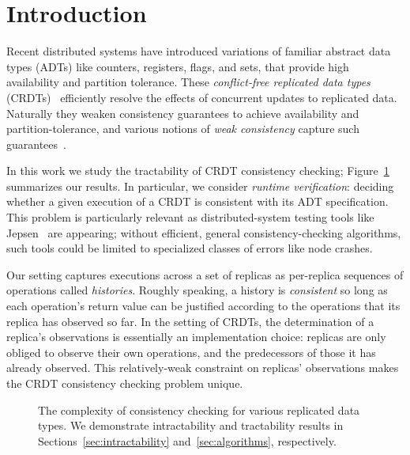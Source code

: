 
\section{Introduction}
\label{sec:intro}

Recent distributed systems have introduced variations of familiar abstract data types (ADTs) like counters, registers, flags, and sets, that provide high availability and partition tolerance. These \emph{conflict-free replicated data types} (CRDTs)~\cite{DBLP:conf/sss/ShapiroPBZ11} efficiently resolve the effects of concurrent updates to replicated data. Naturally they weaken consistency guarantees to achieve availability and partition-tolerance, and various notions of \emph{weak consistency} capture such guarantees~\cite{DBLP:conf/pdis/TerryDPSTW94, DBLP:conf/sosp/TerryTPDSH95, DBLP:conf/popl/MansonPA05, DBLP:journals/ftpl/Burckhardt14, DBLP:conf/popl/BurckhardtGYZ14}.

In this work we study the tractability of CRDT consistency checking; Figure~\ref{fig:results} summarizes our results. In particular, we consider \emph{runtime verification}: deciding whether a given execution of a CRDT is consistent with its ADT specification. This problem is particularly relevant as distributed-system testing tools like Jepsen~\cite{MISC:Jepsen} are appearing; without efficient, general consistency-checking algorithms, such tools could be limited to specialized classes of errors like node crashes.

Our setting captures executions across a set of replicas as per-replica sequences of operations called \emph{histories}. Roughly speaking, a history is \emph{consistent} so long as each operation’s return value can be justified according to the operations that its replica has observed so far. In the setting of CRDTs, the determination of a replica’s observations is essentially an implementation choice: replicas are only obliged to observe their own operations, and the predecessors of those it has already observed. This relatively-weak constraint on replicas’ observations makes the CRDT consistency checking problem unique.

\begin{figure}[t]
  \centering
  
  \caption{The complexity of consistency checking for various replicated data types. We demonstrate intractability and tractability results in Sections~\ref{sec:intractability} and~\ref{sec:algorithms}, respectively.}
  \label{fig:results}
\end{figure}

